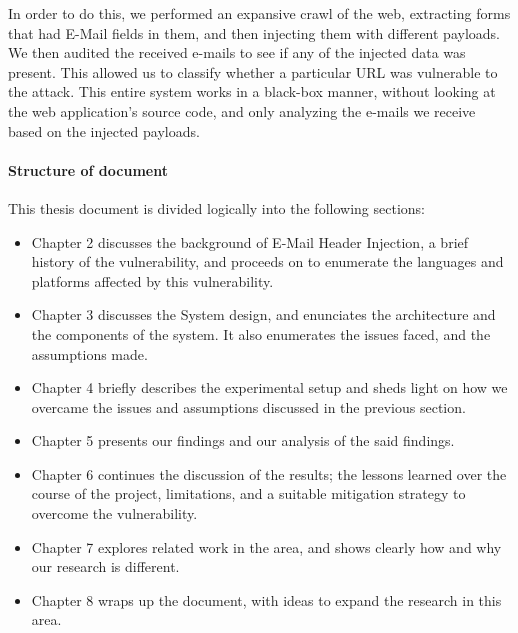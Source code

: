 	In order to do this, we performed an expansive crawl of the web, extracting forms that had E-Mail fields in them, and then injecting them with different payloads. We then audited the received e-mails to see if any of the injected data was present. This allowed us to classify whether a particular URL was vulnerable to the attack. This entire system works in a black-box manner, without looking at the web application's source code, and only analyzing the e-mails we receive based on the injected payloads.

\paragraph{Structure of document} %
This thesis document is divided logically into the following sections:
\begin{itemize}
	\item Chapter 2 discusses the background of E-Mail Header Injection, a brief history of the vulnerability, and proceeds on to enumerate the languages and platforms affected by this vulnerability.
	
	\item Chapter 3 discusses the System design, and enunciates the architecture and the components of the system. It also enumerates the issues faced, and the assumptions made.
	
	\item Chapter 4 briefly describes the experimental setup and sheds light on how we overcame the issues and assumptions discussed in the previous section.
	
	\item Chapter 5 presents our findings and our analysis of the said findings.
	
	\item Chapter 6 continues the discussion of the results; the lessons learned over the course of the project, limitations, and a suitable mitigation strategy to overcome the vulnerability.
	
	\item Chapter 7 explores related work in the area, and shows clearly how and why our research is different.
	
	\item Chapter 8 wraps up the document, with ideas to expand the research in this area.
\end{itemize} 

